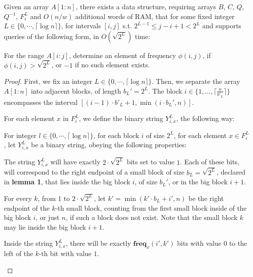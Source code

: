 \documentclass[runningheads]{llncs}
\begin{document}
\begin{lemma}
    Given an array $A[1:n]$, there exists a data structure, requiring arrays $B$, $C$, $Q$, $Q^{-1}$, $F_i^L$ and $ O(n/w) $ additional words of RAM, that for some fixed integer 
    $L \in \{ 0 , \cdots , \lceil  \log n \rceil \}$, for intervals $[i,j]$ s.t. $ 2^{L-1} \leq j-i+1 < 2^{L}$
    and supports queries of the following form, in $O(\sqrt{2^L})$ time:

        For the range $A[i:j]$, determine an element of frequency $\phi(i,j)$, if $\phi(i,j)>\sqrt{2^L}$, or $-1$ if no such element exists. 
\end{lemma}
\begin{proof}
    First, we fix an integer $L \in \{ 0 , \cdots , \lceil  \log n \rceil \}$.
    Then, we separate the array $A[1:n]$ into adjacent blocks, of length $b_L' = 2^L$. The block $i\in \{1,\dots, \lceil \frac{n}{b'_L} \rceil\}$ 
    encompasses the interval $[(i-1) \cdot b'_L +1, \min(i\cdot b_L' , n)]$.
    
    For each element $x$ in $F_i^L$, we define the binary string $Y_{i,x}^L$, the following way:
    \begin{definition}
        For integer $l \in \{ 0 , \cdots , \lceil \log n \rceil \}$, for each block $i$ of size $2^L$, for each element $x \in F_i^L$, let $Y_{i,x}^L$ be a binary string, obeying the following properties:
       \begin{property}
        The string $Y_{i,x}^L$ will have exactly $2\cdot \sqrt{2^L}$ bits set to value $1$. Each of these bits, will correspond to the right endpoint of a small block of size $b_L=\sqrt{2^L}$, declared in \textbf{lemma 1},
         that lies inside the big block $i$, of size $b_L'$, or in the big block $i+1$.
       \end{property}

       \begin{property}
            For every $k$, from $1$ to  $2\cdot \sqrt{2^L}$, let $k'=\min(k'\cdot b_L+i', n)$ be the right endpoint of the $k$-th small block, counting from the first small block inside of the big block $i$, or just $n$, 
            if such a block does not exist. Note that the small block $k$ may lie inside the big block $i+1$.

            Inside the string $Y_{i,x}^L$, there will be exactly $\textbf{freq}_x(i',k')$ bits with value $0$ to the left of the $k$-th bit with value $1$.
        \end{property}

    \end{definition}


\end{proof}
\end{document}

